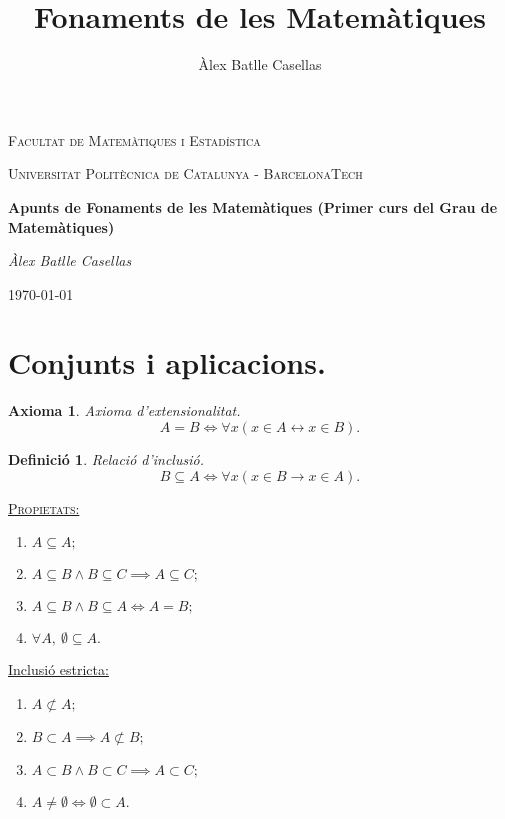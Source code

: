 \documentclass[11pt]{article}
\title{Fonaments de les Matemàtiques}
\author{Àlex Batlle Casellas}
\newcommand{\propietats}{\underline{{\scshape Propietats:}}}
\newtheorem{defi}{Definició}[section]
\newtheorem{ax}{Axioma}[section]
\begin{document}
\begin{titlepage}
	\centering
	{\scshape\LARGE Facultat de Matemàtiques i Estadística \par}
	\vspace{1cm}
	{\scshape\Large Universitat Politècnica de Catalunya - BarcelonaTech\par}
	\vspace{1.5cm}
	{\huge\bfseries Apunts de Fonaments de les Matemàtiques (Primer curs del Grau de Matemàtiques)
	\par}
	\vspace{2cm}
	{\Large\itshape Àlex Batlle Casellas\par}

	\vfill

	{\large \today\par}
\end{titlepage}


\vfill
\newpage

\tableofcontents

\newpage

\section{}

\newpage

\section{Conjunts i aplicacions.}
\begin{ax}
Axioma d'extensionalitat. $$A=B\iff\forall x(x\in A \leftrightarrow x\in B).$$
\end{ax}
\begin{defi}
Relació d'inclusió.
$$B\subseteq A\iff \forall x(x\in B\rightarrow x\in A).$$
\end{defi}
\noindent\propietats
\begin{enumerate}
	\item $A\subseteq A;$
	\item $A\subseteq B\wedge B\subseteq C\implies A\subseteq C;$
	\item $A\subseteq B\wedge B\subseteq A \iff A=B;$
	\item $\forall A, \ \emptyset\subseteq A.$
\end{enumerate}
\underline{Inclusió estricta:}
\begin{enumerate}
	\item $A\not\subset A;$
	\item $B\subset A\implies A\not\subset B;$
	\item $A\subset B\wedge B\subset C\implies A\subset C;$
	\item $A\neq\emptyset\iff\emptyset\subset A.$
\end{enumerate}
\end{document}
